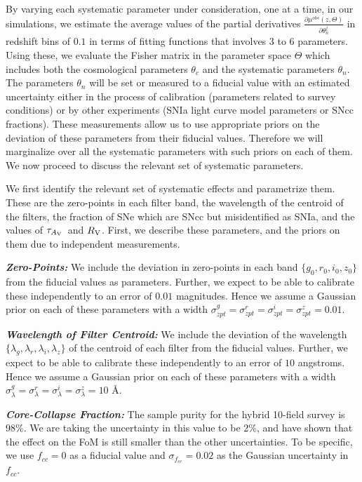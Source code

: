 \documentclass[preprint2]{aastex}    %
\newcommand\rv{$R_{\rm V}$}
\newcommand\tauav{$\tau_{A_{\rm V}}$}
\begin{document}
By varying each systematic parameter under consideration, one at a time,
in our simulations, we estimate the average values of
the partial derivatives $\frac{\partial \mu^{obs}(z,\Theta)}{\partial \theta_n^j}$ in 
redshift bins of $0.1$ in terms of fitting functions that
involves $3$ to $6$ parameters.  Using these,
 we evaluate the Fisher matrix in the parameter space $\Theta$ which
includes both the cosmological parameters $\theta_c$ and the systematic
parameters $\theta_n$. The parameters $\theta_n$ will be set or measured to a fiducial
value with an estimated uncertainty either in the process of calibration
(parameters related to survey conditions) or by other experiments
(SNIa light curve model parameters or SNcc fractions). These measurements
 allow us to use appropriate priors on the deviation of these parameters
from their fiducial values. Therefore we will marginalize over all
the systematic  parameters with such priors on each of them. We now proceed
to discuss the relevant set of systematic parameters.

We first identify the relevant set of systematic effects and parametrize them.
These are the zero-points in each filter band, the
wavelength of the centroid of the filters,
the fraction of SNe which are SNcc but misidentified as SNIa,
and the values of \tauav\ and \rv. First, we describe these
parameters, and the priors on them due to independent measurements.

\noindent\textit{\textbf{Zero-Points:}} We 
include the deviation in zero-points in each band $\{g_0,r_0,i_0,z_0\}$ from the fiducial values as parameters. 
Further, we expect to be able to calibrate these independently to an error 
of $0.01$ magnitudes. Hence we assume a Gaussian prior on each of these 
parameters with a width $\sigma_{zpt}^g = \sigma_{zpt}^r = \sigma_{zpt}^i = \sigma_{zpt}^z =0.01$.\vspace{1mm}

\noindent\textit{\textbf{Wavelength of Filter Centroid:}} We include the deviation of the 
wavelength $\{\lambda_g,\lambda_r,\lambda_i,\lambda_z\}$ of the centroid of each filter from the fiducial values. 
Further, we expect to be able to calibrate these independently to an error 
of $10$ angstroms. Hence we assume a Gaussian prior on each of these 
parameters with a width $\sigma_{\lambda}^g = \sigma_{\lambda}^r = \sigma_{\lambda}^i = \sigma_{\lambda}^z =10$ \AA.\vspace{1mm}

\noindent\textit{\textbf{Core-Collapse Fraction:}} The sample 
purity for the hybrid 10-field survey is 98\%. We are taking the uncertainty in this value to be 2\%, and 
have shown that the effect on the FoM is still smaller than
the other uncertainties.
To be specific, we use $f_{cc}=0$ as a fiducial value and 
$\sigma_{f_{cc}}=0.02$ as the Gaussian uncertainty in $f_{cc}$.\vspace{1mm}
\end{document}
